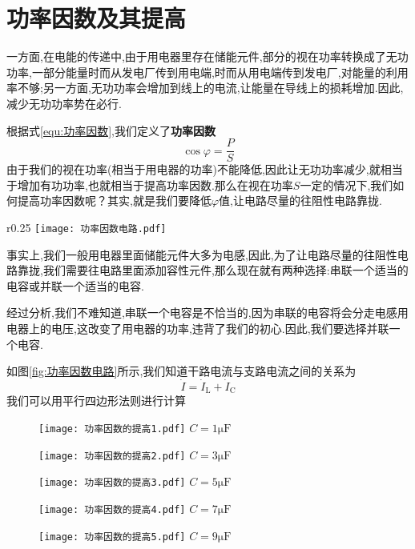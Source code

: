 \section{\K 功率因数及其提高}
\Par 一方面,在电能的传递中,由于用电器里存在储能元件,部分的视在功率转换成了无功功率,一部分能量时而从发电厂传到用电端,时而从用电端传到发电厂,对能量的利用率不够;另一方面,无功功率会增加到线上的电流,让能量在导线上的损耗增加.因此,减少无功功率势在必行.

\Par 根据式\ref{equ:功率因数},我们定义了\textbf{功率因数}
\begin{equation}
    \cos \varphi =\frac{P}{S}
\end{equation}
由于我们的视在功率(相当于用电器的功率)不能降低,因此让无功功率减少,就相当于增加有功功率,也就相当于提高功率因数.那么在视在功率$S$一定的情况下,我们如何提高功率因数呢？其实,就是我们要降低$\varphi $值,让电路尽量的往阻性电路靠拢.

\begin{wrapfigure}{r}{0.25\textwidth}
    \centering
    \texttt{[image: 功率因数电路.pdf]}
    \caption{功率因数}
    \label{fig:功率因数电路}
\end{wrapfigure}
\Par 事实上,我们一般用电器里面储能元件大多为电感,因此,为了让电路尽量的往阻性电路靠拢,我们需要往电路里面添加容性元件,那么现在就有两种选择:串联一个适当的电容或并联一个适当的电容.

\Par 经过分析,我们不难知道,串联一个电容是不恰当的,因为串联的电容将会分走电感用电器上的电压,这改变了用电器的功率,违背了我们的初心.因此,我们要选择并联一个电容.

\Par 如图\ref{fig:功率因数电路}所示,我们知道干路电流与支路电流之间的关系为
\begin{equation*}
    \dot{I}=\dot{I}_{\mathrm{L}}+\dot{I}_{\mathrm{C}}
\end{equation*}
我们可以用平行四边形法则进行计算
\begin{figure}[htbp]
	\centering
	\begin{minipage}{0.18\textwidth}
        \centering
        \texttt{[image: 功率因数的提高1.pdf]}
        $C=1\mathrm{\mu F}$
    \end{minipage}
    \begin{minipage}{0.18\textwidth}
        \centering
        \texttt{[image: 功率因数的提高2.pdf]}
        $C=3\mathrm{\mu F}$
    \end{minipage}
    \begin{minipage}{0.18\textwidth}
        \centering
        \texttt{[image: 功率因数的提高3.pdf]}
        $C=5\mathrm{\mu F}$
    \end{minipage}
    \begin{minipage}{0.18\textwidth}
        \centering
        \texttt{[image: 功率因数的提高4.pdf]}
        $C=7\mathrm{\mu F}$
    \end{minipage}
    \begin{minipage}{0.18\textwidth}
        \centering
        \texttt{[image: 功率因数的提高5.pdf]}
        $C=9\mathrm{\mu F}$
    \end{minipage}
\end{figure}

